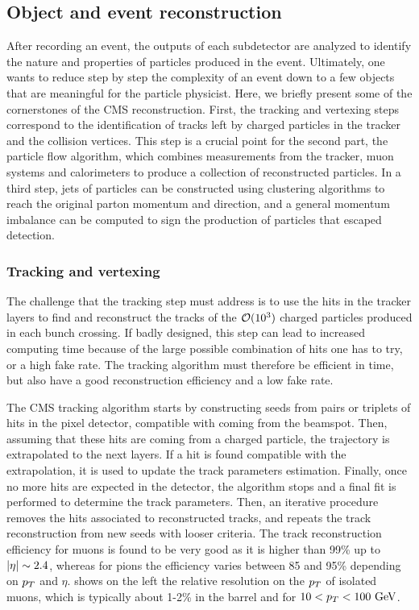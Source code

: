     \subsection{Object and event reconstruction}

    After recording an event, the outputs of each subdetector
    are analyzed to identify the nature and properties of particles produced in the
    event. Ultimately, one wants to reduce step by step the complexity of an event down to
    a few objects that are meaningful for the particle physicist. Here, we briefly present some of the
    cornerstones of the CMS reconstruction. First, the tracking and vertexing steps
    correspond to the identification of tracks left by charged particles in the tracker
    and the collision vertices. This step is a crucial point for the second part, the
    particle flow algorithm, which combines measurements from the tracker, muon systems
    and calorimeters to produce a collection of reconstructed particles. In a third step,
    jets of particles can be constructed using clustering algorithms to reach the original
    parton momentum and direction, and a general momentum imbalance can be computed
    to sign the production of particles that escaped detection.

        \subsubsection{Tracking and vertexing \label{sec:trackingAndVertexing}}

    The challenge that the tracking step must address is to use the hits in the
    tracker layers to find and reconstruct the tracks of the $\mathcal{O}(10^3)$ charged
    particles produced in each bunch crossing. If badly designed, this step can lead
    to increased computing time because of the large possible combination of hits one
    has to try, or a high fake rate. The tracking algorithm must therefore be efficient
    in time, but also have a good reconstruction efficiency and a low fake rate.

    The CMS tracking algorithm \cite{CMStracking} starts by constructing seeds from pairs or triplets of hits
    in the pixel detector, compatible with coming from the beamspot. Then, assuming that these
    hits are coming from a charged particle, the trajectory is extrapolated to the
    next layers. If a hit is found compatible with the extrapolation, it is used to
    update the track parameters estimation. Finally, once no more hits are expected in the
    detector, the algorithm stops and a final fit is performed to determine the track
    parameters. Then, an iterative procedure removes the hits associated to reconstructed
    tracks, and repeats the track reconstruction from new seeds with looser criteria.
    The track reconstruction efficiency for muons is found to be very good as it is
    higher than 99\% up to $\left| \eta \right| \sim 2.4$, whereas for pions the efficiency varies
    between 85 and 95\% depending on $p_T$ and $\eta$. 
    shows on the left the relative resolution on the $p_T$ of isolated muons, which
    is typically about 1-2\% in the barrel and for $10 < p_T < 100~\text{GeV}$.

